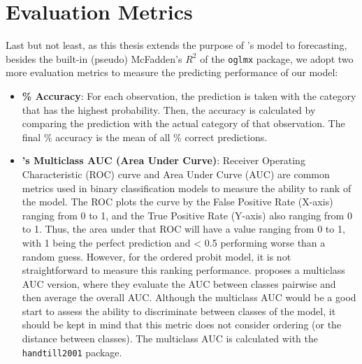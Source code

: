 \section{Evaluation Metrics}

Last but not least, as this thesis extends the purpose of \citet{hausman1992}'s model to forecasting, besides the built-in (pseudo) McFadden's $R^2$ of the \verb|oglmx| package, we adopt two more evaluation metrics to measure the predicting performance of our model:
\begin{itemize}
    \item \textbf{\% Accuracy}: For each observation, the prediction is taken with the category that has the highest probability. Then, the accuracy is calculated by comparing the prediction with the actual category of that observation. The final \% accuracy is the mean of all \% correct predictions.

    \item \textbf{\citet{handtill2001}'s Multiclass AUC (Area Under Curve)}: Receiver Operating Characteristic (ROC) curve and Area Under Curve (AUC) are common metrics used in binary classification models to measure the ability to rank of the model. The ROC plots the curve by the False Positive Rate (X-axis) ranging from 0 to 1, and the True Positive Rate (Y-axis) also ranging from 0 to 1. Thus, the area under that ROC will have a value ranging from 0 to 1, with 1 being the perfect prediction and < 0.5 performing worse than a random guess. However, for the ordered probit model, it is not straightforward to measure this ranking performance. \citet{handtill2001} proposes a multiclass AUC version, where they evaluate the AUC between classes pairwise and then average the overall AUC. Although the multiclass AUC would be a good start to assess the ability to discriminate between classes of the model, it should be kept in mind that this metric does not consider ordering (or the distance between classes). The multiclass AUC is calculated with the \verb|handtill2001| package.
\end{itemize}





